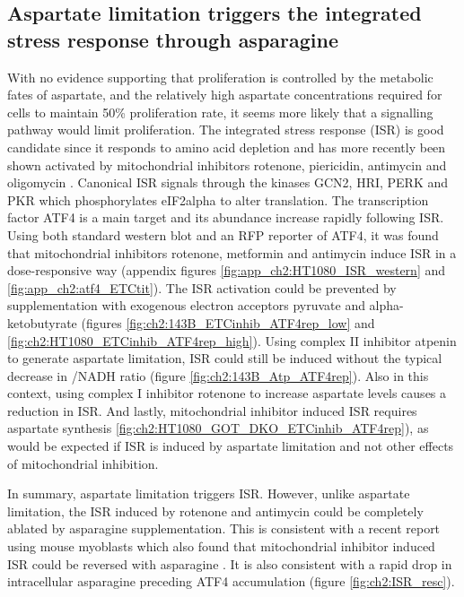\subsection{Aspartate limitation triggers the integrated stress response through asparagine}
With no evidence supporting that proliferation is controlled by the metabolic fates of aspartate, and the relatively high aspartate concentrations required for cells to maintain 50\% proliferation rate, it seems more likely that a signalling pathway would limit proliferation.
The integrated stress response (ISR) is good candidate since it responds to amino acid depletion \cite{Darnell2018-lp} and has more recently been shown activated by mitochondrial inhibitors rotenone, piericidin, antimycin and oligomycin \cite{Guo2020-ia, Mick2020-kf, Condon2021-nz}.
Canonical ISR signals through the kinases GCN2, HRI, PERK and PKR which phosphorylates eIF2alpha to alter translation.
The transcription factor ATF4 is a main target and its abundance increase rapidly following ISR.
Using both standard western blot and an RFP reporter of ATF4, it was found that mitochondrial inhibitors rotenone, metformin and antimycin induce ISR in a dose-responsive way (appendix figures \ref{fig:app_ch2:HT1080_ISR_western} and \ref{fig:app_ch2:atf4_ETCtit}).
The ISR activation could be prevented by supplementation with exogenous electron acceptors pyruvate and alpha-ketobutyrate (figures \ref{fig:ch2:143B_ETCinhib_ATF4rep_low} and \ref{fig:ch2:HT1080_ETCinhib_ATF4rep_high}).
Using complex II inhibitor atpenin to generate aspartate limitation, ISR could still be induced without the typical decrease in \NAD{}/NADH ratio (figure \ref{fig:ch2:143B_Atp_ATF4rep}).
Also in this context, using complex I inhibitor rotenone to increase aspartate levels \cite{Hart2023-gp} causes a reduction in ISR.
And lastly, mitochondrial inhibitor induced ISR requires aspartate synthesis \ref{fig:ch2:HT1080_GOT_DKO_ETCinhib_ATF4rep}), as would be expected if ISR is induced by aspartate limitation and not other effects of mitochondrial inhibition.

In summary, aspartate limitation triggers ISR.
However, unlike aspartate limitation, the ISR induced by rotenone and antimycin could be completely ablated by asparagine supplementation.
This is consistent with a recent report using mouse myoblasts which also found that mitochondrial inhibitor induced ISR could be reversed with asparagine \cite{Mick2020-kf}.
It is also consistent with a rapid drop in intracellular asparagine preceding ATF4 accumulation (figure \ref{fig:ch2:ISR_resc}).

